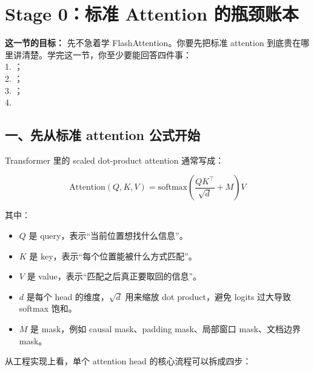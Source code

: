 
\section{Stage 0：标准 Attention 的瓶颈账本}

\begin{conceptbox}
\textbf{这一节的目标：} 先不急着学 FlashAttention。你要先把标准 attention 到底贵在哪里讲清楚。学完这一节，你至少要能回答四件事：\\
1. ；\\
2. ；\\
3. ；\\
4. 
\end{conceptbox}


\subsection{一、先从标准 attention 公式开始}

Transformer 里的 scaled dot-product attention 通常写成：

\[
\mathrm{Attention}(Q,K,V)
=
\mathrm{softmax}\left(\frac{QK^\top}{\sqrt{d}} + M\right)V
\]

其中：
\begin{itemize}[leftmargin=1.5em]
  \item $Q$ 是 query，表示“当前位置想找什么信息”。
  \item $K$ 是 key，表示“每个位置能被什么方式匹配”。
  \item $V$ 是 value，表示“匹配之后真正要取回的信息”。
  \item $d$ 是每个 head 的维度，$\sqrt{d}$ 用来缩放 dot product，避免 logits 过大导致 softmax 饱和。
  \item $M$ 是 mask，例如 causal mask、padding mask、局部窗口 mask、文档边界 mask。
\end{itemize}

从工程实现上看，单个 attention head 的核心流程可以拆成四步：

